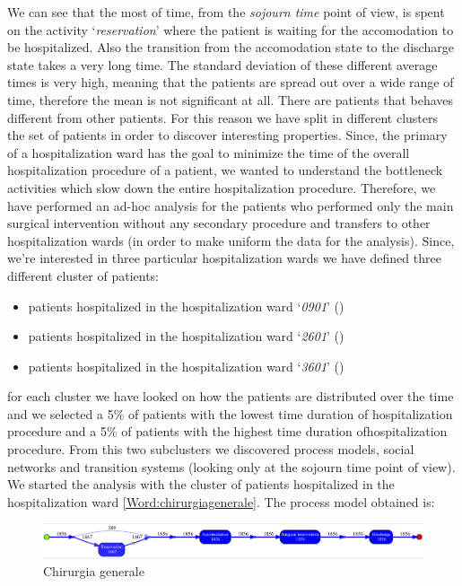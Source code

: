 We can see that the most of time, from the \textit{sojourn time} point of view, is spent on the activity `\textit{reservation}' where the patient is waiting for the accomodation to be hospitalized. Also the transition from the accomodation state to the discharge state takes a very long time. The standard deviation of these different average times is very high, meaning that the patients are spread out over a wide range of time, therefore the mean is not significant at all. There are patients that behaves different from other patients. For this reason we have split in different clusters the set of patients in order to discover interesting properties. Since, the primary of a hospitalization ward has the goal to minimize the time of the overall hospitalization procedure of a patient, we wanted to understand the bottleneck activities which slow down the entire hospitalization procedure. Therefore, we have performed an ad-hoc analysis for the patients who performed only the main surgical intervention without any secondary procedure and transfers to other hospitalization wards (in order to make uniform the data for the analysis). Since, we're interested in three particular hospitalization wards we have defined three different cluster of patients:
\begin{itemize}
\item patients hospitalized in the hospitalization ward `\textit{0901}' () 
\item patients hospitalized in the hospitalization ward `\textit{2601}' ()
\item patients hospitalized in the hospitalization ward `\textit{3601}' ()
\end{itemize}
for each cluster we have looked on how the patients are distributed over the time and we selected a 5\% of patients with the lowest time duration of hospitalization procedure and a 5\% of patients with the highest time duration ofhospitalization procedure. From this two subclusters we discovered process models, social networks and transition systems (looking only at the sojourn time point of view).
\newline
We started the analysis with the cluster of patients hospitalized in the hospitalization ward \ref{Word:chirurgiagenerale}. The process model obtained is:
\begin{figure} [htbp]
\includegraphics[width=\textwidth , keepaspectratio]{RicoveriInductiveVisualMiner0901}
\caption{Chirurgia generale}
\end{figure}
